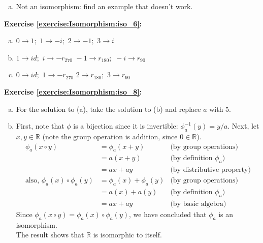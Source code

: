 \begin{enumerate}[(a)]
\item
Not an isomorphism: find an example that doesn't work.

\end{enumerate}

\noindent\textbf{Exercise \ref{exercise:Isomorphism:iso_6}:}

\begin{enumerate}[(a)]
\item
$ 0 \rightarrow 1;\,\,1\rightarrow -i; \,\,2 \rightarrow -1;\,\, 3 \rightarrow i$

\item
$ 1 \rightarrow id;\,\,i \rightarrow -r_{270} \,\,-1 \rightarrow r_{180};\,\, -i \rightarrow r_{90}$

\item
$ 0 \rightarrow id;\,\,1 \rightarrow -r_{270} \,\,2 \rightarrow r_{180};\,\, 3 \rightarrow r_{90}$
\end{enumerate}

\noindent\textbf{Exercise \ref{exercise:Isomorphism:iso_8}:}
\begin{enumerate}[(a)]
\item
For the solution to (a), take the solution to (b) and replace $a$ with 5.
\item
First, note that $\phi$ is a bijection since it is invertible:  $\phi_a^{-1}(y) = y/a$.
Next, let $x,y \in {\mathbb R}$ (note the group operation is addition, since $ 0 \in {\mathbb R}$).
\begin{align*}
\phi_a(x \circ y) &= \phi_a(x + y) &\text{(by group operations)}
\\
&= a(x + y) &\text{(by definition\ } \phi_a)
\\
&= ax + ay &\text{(by distributive property)}
\\
\text{also,\ } \phi_a(x) \circ \phi_a(y) &= \phi_a(x) + \phi_a(y) &\text{(by group operations)}
\\
&= a(x) + a(y) &\text{(by definition\ } \phi_a)
\\
&= ax + ay &\text{(by basic algebra)}
\end{align*}
Since $\phi_a(x \circ y) = \phi_a(x) \circ \phi_a(y)$, we have concluded that $\phi_a$ is an isomorphism.
\\
The result shows that ${\mathbb R}$ is isomorphic to itself.
\\
\end{enumerate}


